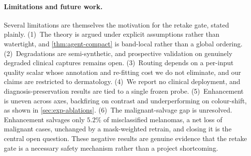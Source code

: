 \paragraph{Limitations and future work.}
Several limitations are themselves the motivation for the retake gate, stated plainly.
(1)~The theory is argued under explicit assumptions rather than watertight, and
\cref{thm:agent-compact} is band-local rather than a global ordering.
(2)~Degradations are semi-synthetic, and prospective validation on genuinely degraded
clinical captures remains open.
(3)~Routing depends on a per-input quality scalar whose annotation and re-fitting cost we
do not eliminate, and our claims are restricted to dermatology.
(4)~We report no clinical deployment, and diagnosis-preservation results are tied to a
single frozen probe.
(5)~Enhancement is uneven across axes, backfiring on contrast and underperforming on
colour-shift, as shown in \cref{sec:exp-ablations}.
(6)~The malignant-salvage gap is unresolved. Enhancement salvages only $5.2\%$ of
misclassified melanomas, a net loss of malignant cases, unchanged by a mask-weighted
retrain, and closing it is the central open question. These negative results are genuine
evidence that the retake gate is a necessary safety mechanism rather than a project
shortcoming.
